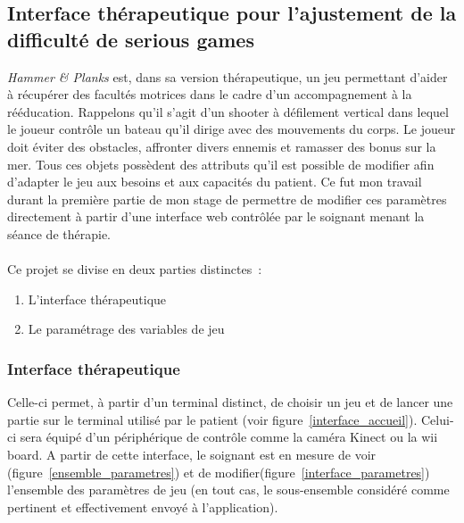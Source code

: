 \subsection{Interface thérapeutique pour l'ajustement de la difficulté de serious games}	
\emph{Hammer \& Planks} est, dans sa version thérapeutique, un jeu permettant d'aider à récupérer des facultés motrices dans le cadre d'un accompagnement à la rééducation. Rappelons qu'il s'agit d'un shooter à défilement vertical dans lequel le joueur contrôle un bateau qu'il dirige avec des mouvements du corps. Le joueur doit éviter des obstacles, affronter divers ennemis et ramasser des bonus sur la mer. Tous ces objets possèdent des attributs qu'il est possible de modifier afin d'adapter le jeu aux besoins et aux capacités du patient. Ce fut mon travail durant la première partie de mon stage de permettre de modifier ces paramètres directement à partir d'une interface web contrôlée par le soignant menant la séance de thérapie.
\paragraph{}
Ce projet se divise en deux parties distinctes~:
\begin{enumerate}
	\item L'interface thérapeutique
	\item Le paramétrage des variables de jeu
\end{enumerate}

	\subsubsection*{Interface thérapeutique}
Celle-ci permet, à partir d'un terminal distinct, de choisir un jeu et de lancer une partie sur le terminal utilisé par le patient (voir figure~\ref{interface_accueil}). Celui-ci sera équipé d'un périphérique de contrôle comme la caméra Kinect ou la wii board. A partir de cette interface, le soignant est en mesure de voir (figure~\ref{ensemble_parametres}) et de modifier(figure~\ref{interface_parametres}) l'ensemble des paramètres de jeu (en tout cas, le sous-ensemble considéré comme pertinent et effectivement envoyé à l'application). 


